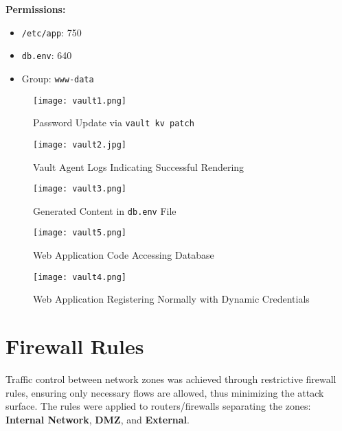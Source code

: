 \documentclass[12pt]{report}
\begin{document}
\textbf{Permissions:}
\begin{itemize}
    \item \texttt{/etc/app}: 750
    \item \texttt{db.env}: 640
    \item Group: \texttt{www-data}
\end{itemize}

\begin{figure}[h]
    \centering
    \texttt{[image: vault1.png]}
    \caption{Password Update via \texttt{vault kv patch}}
    \label{fig:vault-update}
\end{figure}

\begin{figure}[h]
    \centering
    \texttt{[image: vault2.jpg]}
    \caption{Vault Agent Logs Indicating Successful Rendering}
    \label{fig:vault-agent-log}
\end{figure}

\begin{figure}[h]
    \centering
    \texttt{[image: vault3.png]}
    \caption{Generated Content in \texttt{db.env} File}
    \label{fig:vault-db-env}
\end{figure}

\begin{figure}[h]
    \centering
    \texttt{[image: vault5.png]}
    \caption{Web Application Code Accessing Database}
    \label{fig:vault-code-ok}
\end{figure}

\begin{figure}[h]
    \centering
    \texttt{[image: vault4.png]}
    \caption{Web Application Registering Normally with Dynamic Credentials}
    \label{fig:vault-app-ok}
\end{figure}

\clearpage

\section*{Firewall Rules}

Traffic control between network zones was achieved through restrictive firewall rules, ensuring only necessary flows are allowed, thus minimizing the attack surface. The rules were applied to routers/firewalls separating the zones: \textbf{Internal Network}, \textbf{DMZ}, and \textbf{External}.
\end{document}
